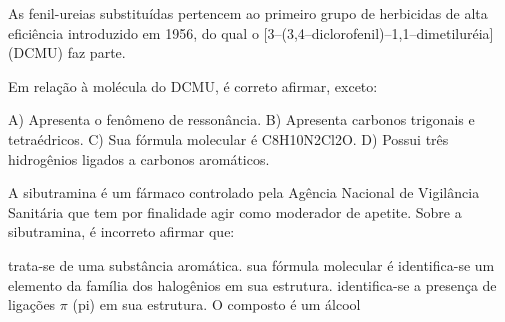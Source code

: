 \documentclass[10pt]{scrartcl}
\begin{document}
\begin{exercise}[points=1]
As fenil-ureias substituídas pertencem ao primeiro grupo de herbicidas de alta eficiência
introduzido em 1956, do qual o [3–(3,4–diclorofenil)–1,1–dimetiluréia] (DCMU) faz parte.



Em relação à molécula do DCMU, é correto afirmar, exceto:


A) Apresenta o fenômeno de ressonância.
B) Apresenta carbonos trigonais e tetraédricos.
C) Sua fórmula molecular é C8H10N2Cl2O.
D) Possui três hidrogênios ligados a carbonos aromáticos.
\end{exercise}
\begin{solution}

\end{solution}







\begin{exercise}[points=1]
A sibutramina é um fármaco controlado pela Agência Nacional de Vigilância Sanitária que tem por finalidade agir como moderador de apetite.
Sobre a sibutramina, é incorreto afirmar que:


\begin{choice}
\choice trata-se de uma substância aromática.
\choice sua fórmula molecular é 
\choice  identifica-se um elemento da família dos halogênios em sua
estrutura.
\choice identifica-se a presença de ligações \(\pi\) (pi) em sua estrutura.
\choice O composto é um álcool
\end{choice}
\end{exercise}
\begin{solution}

\end{solution}
\end{document}
